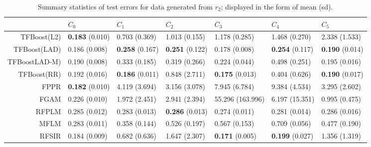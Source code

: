 \begin{table}[H]
\footnotesize
\centering
\begin{tabular}{rllllll}
  \hline
 & $C_0$ & $C_1$ & $C_2$ & $C_3$ & $C_4$ & $C_5$ \\ 
  \hline
TFBoost(L2) & \textbf{0.183} (0.010) & 0.703 (0.369) & 1.013 (0.155) & 1.178 (0.285) & 1.468 (0.270) & 2.338 (1.533) \\ 
  TFBoost(LAD) & 0.186 (0.008) & \textbf{0.258} (0.167) & \textbf{0.251} (0.122) & 0.178 (0.008) & \textbf{0.254} (0.117) & \textbf{0.190} (0.014) \\ 
  TFBoostLAD-M) & 0.190 (0.008) & 0.333 (0.185) & 0.319 (0.266) & 0.224 (0.044) & 0.498 (0.251) & 0.195 (0.016) \\ 
  TFBoost(RR) & 0.192 (0.016) & \textbf{0.186} (0.011) & 0.848 (2.711) & \textbf{0.175} (0.013) & 0.404 (0.626) & \textbf{0.190} (0.017) \\ 
  FPPR & \textbf{0.182} (0.010) & 4.119 (3.694) & 3.156 (3.078) & 7.945 (6.784) & 9.384 (4.534) & 3.295 (2.602) \\ 
  FGAM & 0.226 (0.010) & 1.972 (2.451) & 2.941 (2.394) & 55.296 (163.996) & 6.197 (15.351) & 0.995 (0.475) \\ 
  RFPLM & 0.285 (0.012) & 0.283 (0.013) & \textbf{0.286} (0.013) & 0.274 (0.011) & 0.281 (0.014) & 0.286 (0.016) \\ 
  MFLM & 0.283 (0.011) & 0.358 (0.144) & 0.526 (0.197) & 0.567 (0.153) & 0.709 (0.056) & 0.477 (0.190) \\ 
  RFSIR & 0.184 (0.009) & 0.682 (0.636) & 1.647 (2.307) & \textbf{0.171} (0.005) & \textbf{0.199} (0.027) & 1.356 (1.319) \\ 
   \hline
\end{tabular}
\caption{Summary statistics of test errors for data generated from $r_2$; displayed in the form of mean (sd).} 
\end{table}
